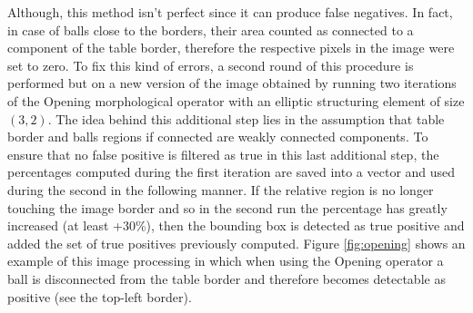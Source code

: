 Although, this method isn't perfect since it can produce false negatives. In fact, in case of balls close to the borders, their area counted as connected to a component 
of the table border, therefore the respective pixels in the image were set to zero. To fix this kind of errors, a second round of this
procedure is performed but on a new version of the image obtained by running two iterations of the Opening morphological operator with an elliptic 
structuring element of size $(3,2)$. The idea behind this additional step lies in the assumption that table border and balls regions if connected
are weakly connected components. To ensure that no false positive is filtered as true in this last additional step, the percentages
computed during the first iteration are saved into a vector and used during the second in the following manner. If the relative region is no longer touching the image border
and so in the second run the percentage has greatly increased (at least +30\%), then the bounding box is detected as true positive and added
the set of true positives previously computed. Figure \ref{fig:opening} shows an example of this image processing in which when using the Opening operator a ball is disconnected
from the table border and therefore becomes detectable as positive (see the top-left border).
